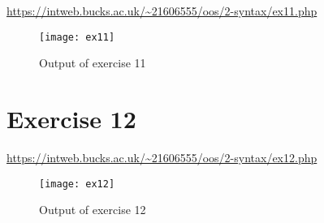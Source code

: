 \url{https://intweb.bucks.ac.uk/~21606555/oos/2-syntax/ex11.php}
\captionsetup{type=figure}


\begin{figure}[H]
  \caption{Output of exercise 11}
  \centering
  \texttt{[image: ex11]}
\end{figure}

\clearpage
\section{Exercise 12}

\url{https://intweb.bucks.ac.uk/~21606555/oos/2-syntax/ex12.php}
\captionsetup{type=figure}


\begin{figure}[H]
  \caption{Output of exercise 12}
  \centering
  \texttt{[image: ex12]}
\end{figure}
